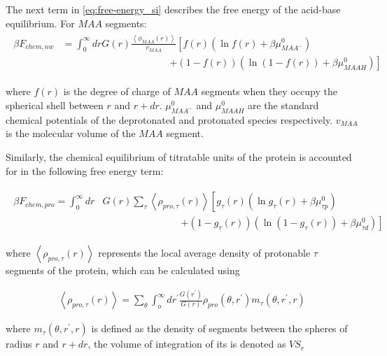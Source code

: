 \documentclass[journal=jacsat,manuscript=suppinfo]{achemso}
\begin{document}
The next term in \cref{eq:free-energy_si} describes the free energy of the acid-base equilibrium.
For $MAA$ segments:
\begin{align}
	\begin{aligned}
		\beta F_{chem,nw} &= \int_0^\infty drG(r) \frac{\left<\phi_{MAA}(r)\right>}{v_{MAA}} \left[f(r)(\ln f(r)+ \beta\mu^0_{MAA^-})\right.\\
		&\hspace{11em}\left.+(1-f(r))(\ln (1-f(r))+\beta\mu^0_{MAAH})\right]    
	\end{aligned}
\end{align} 


\noindent where $f(r)$ is the degree of charge of $MAA$ segments when they occupy  the spherical shell between $r$ and $r + dr$. 
$\mu^0_{MAA^-}$ and $\mu^0_{MAAH}$ are the standard chemical potentials of the deprotonated and protonated species respectively. $v_{MAA}$ is the molecular volume of the $MAA$ segment.



Similarly, the chemical equilibrium of titratable units of the protein is accounted for in the following free energy term:

\begin{align}
	\begin{aligned}
		\beta F_{chem,pro} =\int_0^\infty dr &G(r) \sum_\tau \left<\rho_{pro,\tau}(r)\right> \left[g_\tau(r)(\ln g_\tau(r)+ \beta\mu^0_{\tau p})\right.\\
		&\hspace{8em}\left.+(1-g_\tau(r))(\ln (1-g_\tau(r))+\beta\mu^0_{\tau d})\right]   
		\label{eq:Fchempro_si}
	\end{aligned}
\end{align} 

\noindent where $\left<\rho_{pro,\tau}(r)\right>$ represents the local average density of protonable $\tau$ segments of the protein, which can be calculated using

\begin{align}
	\left<\rho_{pro,\tau}(r)\right> = \sum_\theta \int_o^\infty dr^\prime \frac{G(r^\prime)}{G(r)} \rho_{pro}(\theta,r^\prime)m_\tau(\theta,r^\prime,r)
	\label{eq:segments_pro_si}
\end{align}


\noindent where $m_\tau(\theta,r^\prime,r)$ is defined as the density of segments between the spheres of radius $r$ and $r + dr$, the volume of integration of its is denoted as $VS_r$
\end{document}
